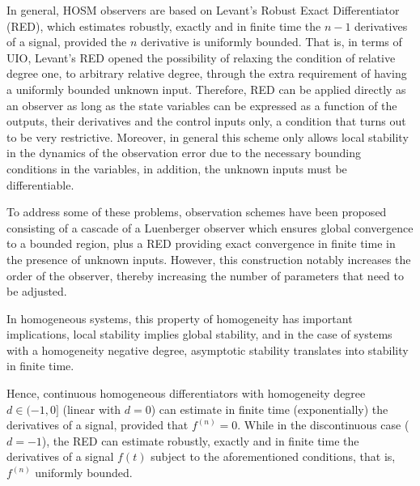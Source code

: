 \documentclass[11pt,letterpaper,twoside,openright]{report}
\begin{document}
In general, HOSM observers are based on Levant's Robust Exact Differentiator (RED)\cite{Levant1998},\cite{Levant2003}\cite{Levant2005} which estimates robustly, exactly and in finite time the $n-1$ derivatives of a signal, provided the $n$ derivative is uniformly bounded. That is, in terms of UIO, Levant's RED opened the possibility of relaxing the condition of relative degree one, to arbitrary relative degree, through the extra requirement of having a uniformly bounded unknown input. Therefore, RED can be applied directly as an observer as long as the state variables can be expressed as a function of the outputs, their derivatives and the control inputs only, a condition that turns out to be very restrictive. Moreover, in general this scheme only allows local stability in the dynamics of the observation error due to the necessary bounding conditions in the variables, in addition, the unknown inputs must be differentiable.

To address some of these problems, observation schemes have been proposed consisting of a cascade of a Luenberger observer which ensures global convergence to a bounded region, plus a RED providing exact convergence in finite time in the presence of unknown inputs\cite{Fridman2007}\cite{Fridman2008}\cite{Fridman2011}\cite{Shtessel2014}. However, this construction notably increases the order of the observer, thereby increasing the number of parameters that need to be adjusted.

In homogeneous systems, this property of homogeneity has important implications, local stability implies global stability, and in the case of systems with a homogeneity negative degree, asymptotic stability translates into stability in finite time\cite{Bernstein1997}\cite{Bernstein2000}.

Hence, continuous homogeneous differentiators with homogeneity degree $d\in(-1,0]$ (linear with $d=0$) can estimate in finite time (exponentially) the derivatives of a signal, provided that $f^{(n)}=0$\cite{Tonametl2018}. While in the discontinuous case ($d=-1$), the RED can estimate robustly, exactly and in finite time the derivatives of a signal $f(t)$ subject to the aforementioned conditions, that is, $f^{(n)} $ uniformly bounded\cite{Levant2003}.
\end{document}
